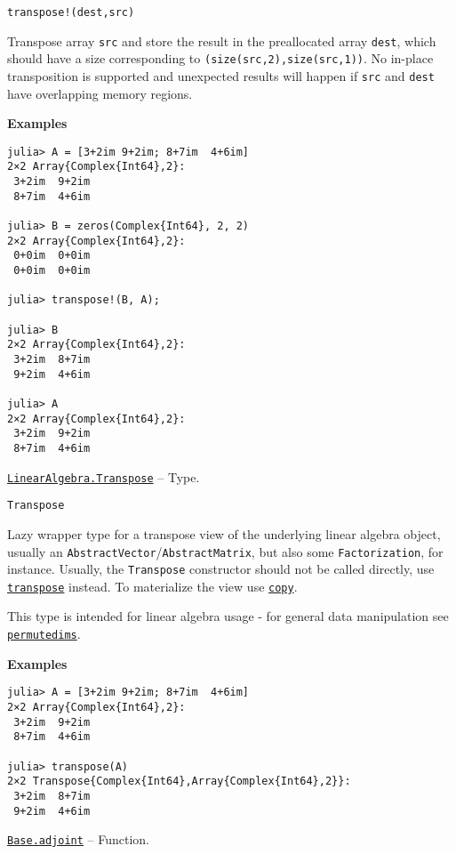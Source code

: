 \begin{adjustwidth}{2em}{0pt}


\begin{verbatim}
transpose!(dest,src)
\end{verbatim}

Transpose array \texttt{src} and store the result in the preallocated array \texttt{dest}, which should have a size corresponding to \texttt{(size(src,2),size(src,1))}. No in-place transposition is supported and unexpected results will happen if \texttt{src} and \texttt{dest} have overlapping memory regions.

\textbf{Examples}


\begin{verbatim}
julia> A = [3+2im 9+2im; 8+7im  4+6im]
2×2 Array{Complex{Int64},2}:
 3+2im  9+2im
 8+7im  4+6im

julia> B = zeros(Complex{Int64}, 2, 2)
2×2 Array{Complex{Int64},2}:
 0+0im  0+0im
 0+0im  0+0im

julia> transpose!(B, A);

julia> B
2×2 Array{Complex{Int64},2}:
 3+2im  8+7im
 9+2im  4+6im

julia> A
2×2 Array{Complex{Int64},2}:
 3+2im  9+2im
 8+7im  4+6im
\end{verbatim}



\end{adjustwidth}
\hypertarget{14692313863932962816}{} 
\hyperlink{14692313863932962816}{\texttt{LinearAlgebra.Transpose}}  -- {Type.}

\begin{adjustwidth}{2em}{0pt}


\begin{verbatim}
Transpose
\end{verbatim}

Lazy wrapper type for a transpose view of the underlying linear algebra object, usually an \texttt{AbstractVector}/\texttt{AbstractMatrix}, but also some \texttt{Factorization}, for instance. Usually, the \texttt{Transpose} constructor should not be called directly, use \hyperlink{12700837529519091997}{\texttt{transpose}} instead. To materialize the view use \hyperlink{15665284441316555522}{\texttt{copy}}.

This type is intended for linear algebra usage - for general data manipulation see \hyperlink{10913801624539723467}{\texttt{permutedims}}.

\textbf{Examples}


\begin{verbatim}
julia> A = [3+2im 9+2im; 8+7im  4+6im]
2×2 Array{Complex{Int64},2}:
 3+2im  9+2im
 8+7im  4+6im

julia> transpose(A)
2×2 Transpose{Complex{Int64},Array{Complex{Int64},2}}:
 3+2im  8+7im
 9+2im  4+6im
\end{verbatim}



\end{adjustwidth}
\hypertarget{10565518144285607255}{} 
\hyperlink{10565518144285607255}{\texttt{Base.adjoint}}  -- {Function.}

